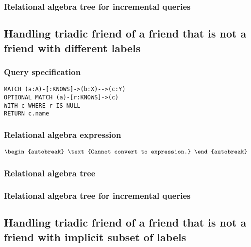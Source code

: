 
\subsubsection*{Relational algebra tree for incremental queries}


\subsection{Handling triadic friend of a friend that is not a friend with different labels}

\subsubsection*{Query specification}

\begin{lstlisting}
MATCH (a:A)-[:KNOWS]->(b:X)-->(c:Y)
OPTIONAL MATCH (a)-[r:KNOWS]->(c)
WITH c WHERE r IS NULL
RETURN c.name
\end{lstlisting}

\subsubsection*{Relational algebra expression}

\begin{align*}
\begin{autobreak}
\text{Cannot convert to expression.}
\end{autobreak}
\end{align*}

\subsubsection*{Relational algebra tree}


\subsubsection*{Relational algebra tree for incremental queries}


\subsection{Handling triadic friend of a friend that is not a friend with implicit subset of labels}

